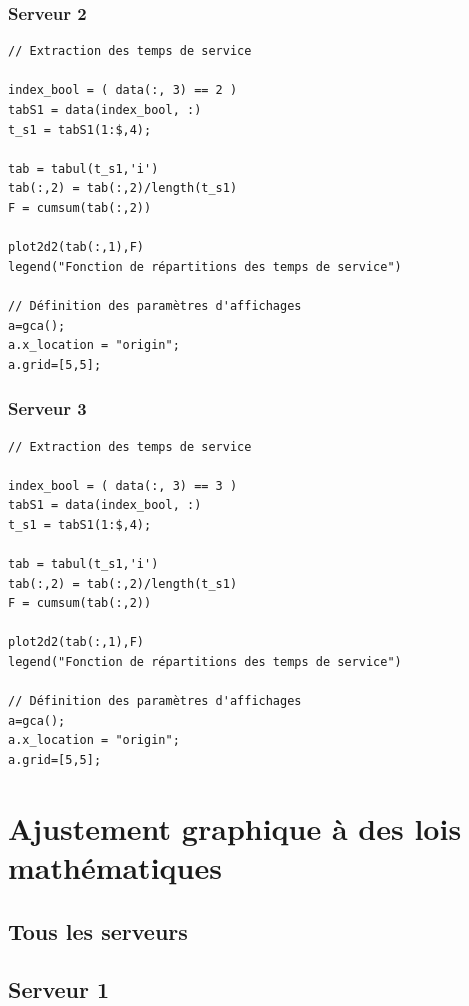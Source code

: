 \documentclass{article}
\begin{document}
\subsubsection{Serveur 2}
\begin{verbatim}
// Extraction des temps de service

index_bool = ( data(:, 3) == 2 )
tabS1 = data(index_bool, :)
t_s1 = tabS1(1:$,4);

tab = tabul(t_s1,'i')
tab(:,2) = tab(:,2)/length(t_s1)
F = cumsum(tab(:,2))

plot2d2(tab(:,1),F)
legend("Fonction de répartitions des temps de service")

// Définition des paramètres d'affichages
a=gca();
a.x_location = "origin";
a.grid=[5,5];
\end{verbatim}

\subsubsection{Serveur 3}
\begin{verbatim}
// Extraction des temps de service

index_bool = ( data(:, 3) == 3 )
tabS1 = data(index_bool, :)
t_s1 = tabS1(1:$,4);

tab = tabul(t_s1,'i')
tab(:,2) = tab(:,2)/length(t_s1)
F = cumsum(tab(:,2))

plot2d2(tab(:,1),F)
legend("Fonction de répartitions des temps de service")

// Définition des paramètres d'affichages
a=gca();
a.x_location = "origin";
a.grid=[5,5];
\end{verbatim}

\section{Ajustement graphique à des lois mathématiques}

\subsection{Tous les serveurs}

\subsection{Serveur 1}
\end{document}
